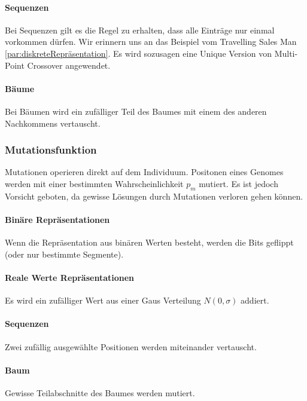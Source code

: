         \paragraph{Sequenzen}
          Bei Sequenzen gilt es die Regel zu erhalten, dass alle Einträge nur einmal vorkommen dürfen. Wir erinnern uns an das Beispiel vom Travelling Sales Man \ref{par:diskreteRepräsentation}.
          Es wird sozusagen eine Unique Version von  Multi-Point Crossover angewendet.

        \paragraph{Bäume}
          Bei Bäumen wird ein zufälliger Teil des Baumes mit einem des anderen Nachkommens vertauscht.

    \subsubsection{Mutationsfunktion}
      Mutationen operieren direkt auf dem Individuum. Positonen eines Genomes werden mit einer bestimmten Wahrscheinlichkeit \(p_{m}\) mutiert.
      Es ist jedoch Vorsicht geboten, da gewisse Lösungen durch Mutationen verloren gehen können.

      \paragraph{Binäre Repräsentationen}
        Wenn die Repräsentation aus binären Werten besteht, werden die Bits geflippt (oder nur bestimmte Segmente).

      \paragraph{Reale Werte Repräsentationen}
        Es wird ein zufälliger Wert aus einer Gaus Verteilung \(N(0,\sigma)\) addiert.

      \paragraph{Sequenzen}
        Zwei zufällig ausgewählte Positionen werden miteinander vertauscht.

      \paragraph{Baum}
        Gewisse Teilabschnitte des Baumes werden mutiert.

